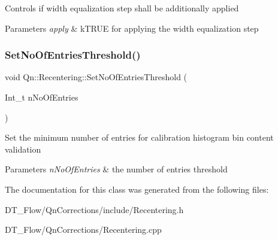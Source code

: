 Controls if width equalization step shall be additionally applied 
\begin{DoxyParams}{Parameters}
{\em apply} & k\+T\+R\+UE for applying the width equalization step \\
\hline
\end{DoxyParams}
\mbox{\label{classQn_1_1Recentering_ab9c1d5914e7e8007bbd7039ef5430d3d}} 
\subsubsection{\texorpdfstring{Set\+No\+Of\+Entries\+Threshold()}{SetNoOfEntriesThreshold()}}
{\footnotesize\ttfamily void Qn\+::\+Recentering\+::\+Set\+No\+Of\+Entries\+Threshold (\begin{DoxyParamCaption}\item[{Int\+\_\+t}]{n\+No\+Of\+Entries }\end{DoxyParamCaption})\hspace{0.3cm}{\ttfamily [inline]}}

Set the minimum number of entries for calibration histogram bin content validation 
\begin{DoxyParams}{Parameters}
{\em n\+No\+Of\+Entries} & the number of entries threshold \\
\hline
\end{DoxyParams}


The documentation for this class was generated from the following files\+:\begin{DoxyCompactItemize}
\item 
D\+T\+\_\+\+Flow/\+Qn\+Corrections/include/Recentering.\+h\item 
D\+T\+\_\+\+Flow/\+Qn\+Corrections/Recentering.\+cpp\end{DoxyCompactItemize}
